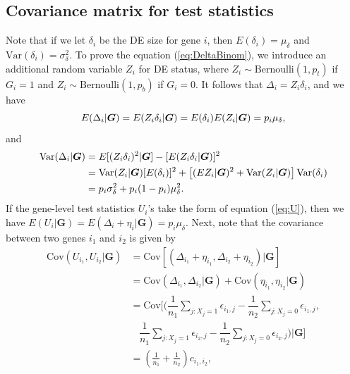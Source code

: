 \documentclass[a4,center,fleqn]{NAR}
\newcommand{\cov}{\text{Cov}}
\newcommand{\var}{\text{Var}}
\begin{document}
	\subsection{Covariance matrix for test statistics}\label{app:covariance}
	Note that if we let $\delta_i$ be the DE size for gene $i$, then $E(\delta_i)= \mu_{\delta}$ 
	and $\var(\delta_i) = \sigma_{\delta}^2$. To prove the equation (\ref{eq:DeltaBinom}), we 
	introduce an additional random variable $Z_i$ for DE status, where 
	$Z_i\sim \text{Bernoulli}(1, p_t)$ if $G_i = 1$ and $Z_i\sim \text{Bernoulli}(1, p_b)$ if $G_i 
	= 0$. It follows that $\Delta_i =Z_i\delta_i$, and we have 
	\begin{equation}\notag
		E(\Delta_i|\bm G) = E(Z_i\delta_i|\bm G) = E(\delta_i)E(Z_i|\bm G)=  p_i\mu_{\delta},
	\end{equation}
	and 
	\begin{equation}\notag
		\begin{aligned}
			\text{Var}(\Delta_i|\bm G) & = E[(Z_i\delta_i)^2|\bm G]- [E(Z_i\delta_i|\bm G)]^2 \\
			& = \text{Var}(Z_i|\bm G)[E(\delta_i)]^2 + \left[(EZ_i|\bm G)^2 + 
			\text{Var}(Z_i|\bm G)\right]\text{Var}(\delta_i) \\
			& =p_i\sigma_{\delta}^2 + p_i(1-p_i)\mu_{\delta}^2.
		\end{aligned}
	\end{equation}
	If the gene-level test statistics $U_i$'s take the form of equation (\ref{eq:U}), then we have 
	$E(U_i|\bm G) = E(\Delta_i + \eta_i|\bm G)  = p_i\mu_{\delta}$. Next, note that the covariance 
	between two genes $i_1$ and $i_2$ is given by 
	\begin{equation}\label{eq:app1}
		\begin{aligned}
			\text{Cov}(U_{i_1}, U_{i_2}|\bm G) & =\cov\left[(\Delta_{i_1} + \eta_{i_1}, 
			\Delta_{i_2} + 
			\eta_{i_2})|\bm G\right] \\
			& = \text{Cov}(\Delta_{i_1}, \Delta_{i_2}|\bm G) + \text{Cov}(\eta_{i_1}, 
			\eta_{i_2}|\bm G)\\
			& = \text{Cov}\biggl[(\dfrac{1}{n_1}\sum_{j: X_j=1}\epsilon_{i_1,j}-
			\dfrac{1}{n_2}\sum_{j: X_j=0}\epsilon_{i_1,j}, \\
			&~~~~\dfrac{1}{n_1}\sum_{j: 
			X_j=1}\epsilon_{i_2,j}-
			\dfrac{1}{n_2}\sum_{j: X_j=0}\epsilon_{i_2,j})|\bm G \biggl]\\
			& = \left(\frac{1}{n_1} + \frac{1}{n_2}\right)c_{i_1,i_2},
		\end{aligned}
	\end{equation}
\end{document}
